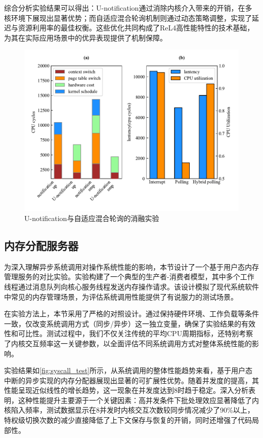 综合分析实验结果可以得出：U-notification通过消除内核介入带来的开销，在多核环境下展现出显著优势；而自适应混合轮询机制则通过动态策略调整，实现了延迟与资源利用率的最佳权衡。这些优化共同构成了ReL4高性能特性的技术基础，为其在实际应用场景中的优异表现提供了机制保障。

\begin{figure}[htbp]
    \centering
    \includegraphics[width=1.0\textwidth]{figures/ntfn_test.pdf}
    \caption{U-notification与自适应混合轮询的消融实验}\label{fig:ntfn_test}
\end{figure}

\subsection{内存分配服务器}
为深入理解异步系统调用对操作系统性能的影响，本节设计了一个基于用户态内存管理服务的对比实验。实验构建了一个典型的生产者-消费者模型，其中多个工作线程通过消息队列向核心服务线程发送内存操作请求。该设计模拟了现代系统软件中常见的内存管理场景，为评估系统调用性能提供了有说服力的测试场景。

在实验方法上，本节采用了严格的对照设计。通过保持硬件环境、工作负载等条件一致，仅改变系统调用方式（同步/异步）这一独立变量，确保了实验结果的有效性和可比性。测试过程中，我们不仅关注传统的平均CPU周期指标，还特别考察了内核交互频率这一关键参数，以全面评估不同系统调用方式对整体系统性能的影响。

实验结果如\ref{fig:syscall_test}所示，从系统调用的整体性能趋势来看，基于用户态中断的异步实现的内存分配器展现出显著的可扩展性优势。随着并发度的提高，其性能呈现近似线性的增长趋势，这一现象在并发度达到8时趋于稳定。深入分析表明，这种性能提升主要源于一个关键因素：高并发条件下批处理效应显著降低了内核陷入频率，测试数据显示在8并发时内核交互次数较同步情况减少了90\%以上，特权级切换次数的减少直接降低了上下文保存与恢复的开销，同时还增强了代码局部性。

